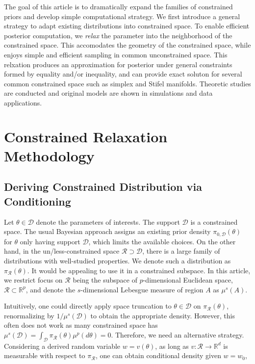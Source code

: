 \documentclass[10pt,fleqn]{article}
\newcommand{\bb}[1]{\mathbb{#1}}
\newcommand{\mc}[1]{\mathcal{#1}}
\DeclareMathOperator{\1}{\mathbbm{1}}
\begin{document}
The goal of this article is to dramatically expand the families of constrained priors and develop simple computational strategy. We first introduce a general strategy to adapt existing distributions into constrained space. To enable efficient posterior computation, we {\em relax} the parameter into the neighborhood of the constrained space. This accomodates the geometry of the constrained space, while enjoys simple and efficient sampling in common unconstrained space. This relxation produces an approximation for posterior under general constraints formed by equality and/or inequality, and can provide exact soluton for several common constrained space such as simplex and Stifel manifolds. Theoretic
studies are conducted and original models are shown in simulations and data
applications.




\section{Constrained Relaxation Methodology}

\subsection{Deriving Constrained Distribution via Conditioning}

Let $\theta \in \mc D$ denote the parameters of interests. The support $\mc
D$ is a constrained space. The usual Bayesian approach assigns an existing prior
density $\pi_{0,\mc D}(\theta)$ for $\theta$ only having support $\mc D$, which limits the available choices. On the other hand, in the un/less-constrained space $\mc R\supset \mc D$, there is a large family of
distributions with well-studied properties. We denote such a distribution as $\pi_{\mc R}(\theta)$. It would be appealing to 
use it in a constrained subspace. In this article, we restrict focus on $\mc R$ being the subspace of $p$-dimensional Euclidean space, $\mc R\subset \bb R^p$, and denote the $s$-dimensional Lebesgue measure of region $A$ as $\mu^s(A)$.

Intuitively, one could directly apply space truncation to ${\theta\in\mc D}$ on $\pi_{\mc R}(\theta)$, renormalizing by $1/\mu^s(\mc D)$ to obtain the appropriate density. However, this often does not work as many constrained
space has $\mu^s(\mc D)=\int_{\mc D}  \pi_{\mc R}(\theta) \mu^p(d\theta)=0$. Therefore, we need an alternative strategy. Considering a derived random variable $w=v(\theta)$, as long as $v:\mc R\rightarrow \bb R^d$ is measurable with respect to $\pi_{\mc R}$, one can obtain conditional density given $w=w_0$,
\end{document}
